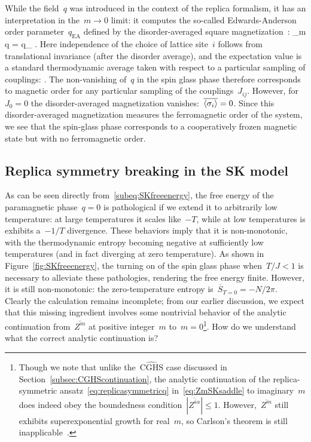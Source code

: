 \documentclass[12pt]{article}
\begin{document}
While the field~$q$ was introduced in the context of the replica formalism, it has an interpretation in the~$m \to 0$ limit: it computes the so-called Edwards-Anderson order parameter~$q_\mathrm{EA}$ defined by the disorder-averaged square magnetization~\cite{EdwAnd75}:
\be
\lim_{m } q = q_ \equiv {}.
\ee
Here independence of the choice of lattice site~$i$ follows from translational invariance (after the disorder average), and the expectation value is a standard thermodynamic average taken with respect to a particular sampling of couplings:
\be
{} \equiv {}.
\ee
The non-vanishing of~$q$ in the spin glass phase therefore corresponds to magnetic order for any particular sampling of the couplings~$J_{ij}$.  However, for~$J_0 = 0$ the disorder-averaged magnetization vanishes:~$\overline{\left\langle \sigma_i \right\rangle} = 0$.  Since this disorder-averaged magnetization measures the ferromagnetic order of the system, we see that the spin-glass phase corresponds to a cooperatively frozen magnetic state but with no ferromagnetic order.


\subsection{Replica symmetry breaking in the SK model}

As can be seen directly from~\eqref{subeq:SKfreeenergy}, the free energy of the paramagnetic phase~$q = 0$ is pathological if we  extend it to arbitrarily low temperature: at large temperatures it scales like~$-T$, while at low temperatures is exhibits a~$-1/T$ divergence.  These behaviors imply that it is non-monotonic, with the thermodynamic entropy becoming negative at sufficiently low temperatures (and in fact diverging at zero temperature).  As shown in Figure~\ref{fig:SKfreeenergy}, the turning on of the spin glass phase when~$T/J < 1$ is necessary to alleviate these pathologies, rendering the free energy finite.  However, it is still non-monotonic: the zero-temperature entropy is~$\overline{S}_{T = 0} = -N/2\pi$.  Clearly the calculation remains incomplete; from our earlier discussion, we expect that this missing ingredient involves some nontrivial behavior of the analytic continuation from~$\overline{Z^m}$ at positive integer~$m$ to~$m = 0$\footnote{Though we note that unlike the~$\widehat{\mathrm{CGHS}}$ case discussed in Section~\ref{subsec:CGHScontinuation}, the analytic continuation of the replica-symmetric ansatz~\eqref{eq:replicasymmetricq} in~\eqref{eq:ZmSKsaddle} to imaginary~$m$ does indeed obey the boundedness condition~$\left|\overline{Z^{i\alpha}}\right| \leq 1$.  However,~$\overline{Z^m}$ still exhibits superexponential growth for real~$m$, so Carlson's theorem is still inapplicable~\cite{HemmenPalmer79}.}.  How do we understand what the correct analytic continuation is?
\end{document}
